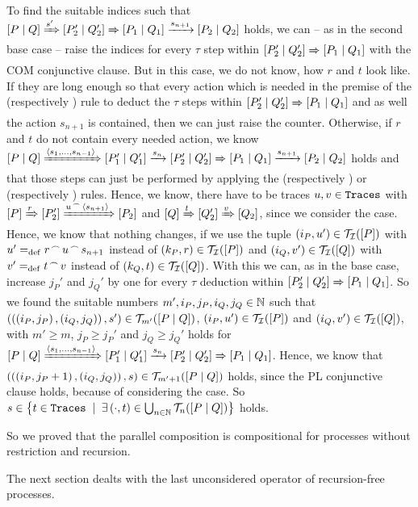 \begin{prf}
\begin{description}
To find the suitable indices such that $\left[P \mid Q\right]\xRightarrow{s'}\left[P_2' \mid Q_2'\right]\xRightarrow{}\left[P_1 \mid Q_1\right]\xrightarrow{s_{n+1}}\left[P_2 \mid Q_2\right]$ holds, we can -- as in the second base case -- raise the indices for every $\tau$ step within $\left[P_2' \mid Q_2'\right]\xRightarrow{}\left[P_1 \mid Q_1\right]$ with the COM conjunctive clause. But in this case, we do not know, how $r$ and $t$ look like. If they are long enough so that every action which is needed in the premise of the \ecoml{} (respectively \ecomr{}) rule to deduct the $\tau$ steps within $\left[P_2' \mid Q_2'\right]\xRightarrow{}\left[P_1 \mid Q_1\right]$ and as well the action $s_{n+1}$ is contained, then we can just raise the counter. Otherwise, if $r$ and $t$ do not contain every needed action, we know $\left[P \mid Q\right]\xRightarrow{\langle s_1,\ldots,s_{n-1}\rangle}\left[P_1' \mid Q_1'\right]\xrightarrow{s_n}\left[P_2' \mid Q_2'\right]\xRightarrow{}\left[P_1 \mid Q_1\right]\xrightarrow{s_{n+1}}\left[P_2 \mid Q_2\right]$ holds and that those steps can just be performed by applying the \eparl{} (respectively \eparr{}) or \ecoml{} (respectively \ecomr) rules. Hence, we know, there have to be traces $u,v\in\mathtt{Traces}$ with $\left[P\right]\xRightarrow{r}\left[P_2'\right]\xRightarrow{{u}^{\,\frown{}\,}{\langle s_{n+1}\rangle}}\left[P_2\right]$ and $\left[Q\right]\xRightarrow{t}\left[Q_2'\right]\xRightarrow{v}\left[Q_2\right]$, since we consider the \eparl{} case. Hence, we know that nothing changes, if we use the tuple $\left(i_P,u'\right)\in\mathcal{T_I}(\left[P\right])$ with $u'=_{\mathrm{def}}{{r}^{\,\frown{}\,}{u}}^{\,\frown{}\,}{s_{n+1}}$ instead of $\left(k_P,r\right)\in\mathcal{T_I}(\left[P\right])$ and $\left(i_Q,v'\right)\in\mathcal{T_I}(\left[Q\right])$ with $v'=_{\mathrm{def}}{t}^{\,\frown{}\,}{v}$ instead of $\left(k_Q,t\right)\in\mathcal{T_I}(\left[Q\right])$. With this we can, as in the base case, increase $j_P'$ and $j_Q'$ by one for every $\tau$ deduction within $\left[P_2' \mid Q_2'\right]\xRightarrow{}\left[P_1 \mid Q_1\right]$. So we found the suitable numbers $m',i_P,j_P,i_Q,j_Q\in\mathbb N$ such that $\left(\left(\left(i_P,j_P\right),\left(i_Q,j_Q\right)\right),s'\right)\in\mathcal T_{m'}(\left[P \mid Q\right])$, $\left(i_P,u'\right)\in\mathcal{T_I}(\left[P\right])$ and $\left(i_Q,v'\right)\in\mathcal{T_I}(\left[Q\right])$, with $m'\geq{}m$, $j_P\geq{}j_P'$ and $j_Q\geq{}j_Q'$ holds for $\left[P \mid Q\right]\xRightarrow{\langle s_1,\ldots,s_{n-1}\rangle}\left[P_1' \mid Q_1'\right]\xrightarrow{s_n}\left[P_2' \mid Q_2'\right]\xRightarrow{}\left[P_1 \mid Q_1\right]$. Hence, we know that $\left(\left(\left(i_P,j_P+1\right),\left(i_Q,j_Q\right)\right),s\right)\in\mathcal T_{m'+1}(\left[P \mid Q\right])$ holds, since the PL conjunctive clause holds, because of considering the \eparl{} case. So $s\in\set[\exists\left(\cdot,t\right)\in\bigcup_{n\in\N}\tracesI{n}{P}{Q}]{t\in\tr}$ holds.
\end{description}
So we proved that the parallel composition is compositional for processes without restriction and recursion.
\end{prf}

The next section dealts with the last unconsidered operator of recursion-free \picalc{} processes.
